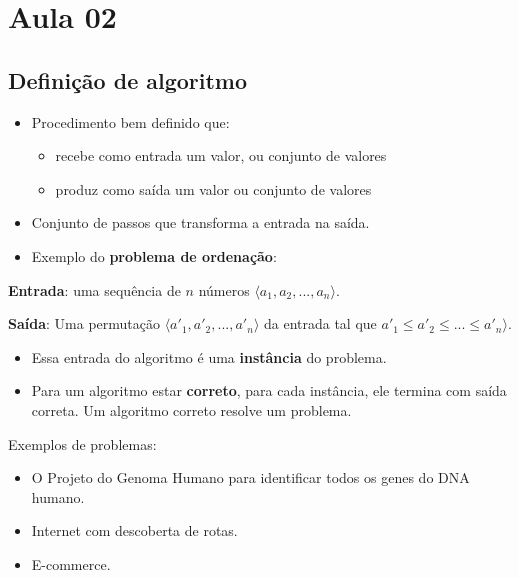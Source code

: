 \section{Aula 02}

\subsection{Definição de algoritmo}

\begin{itemize}
\item Procedimento bem definido que:
	\begin{itemize}
	\item recebe como entrada um valor, ou conjunto de valores
	\item produz como saída um valor ou conjunto de valores
	\end{itemize}
\item Conjunto de passos que transforma a entrada na saída.
\item Exemplo do {\bf problema de ordenação}:
\end{itemize}

{\bf Entrada}: uma sequência de $n$ números $\langle a_1, a_2, ..., a_n \rangle$.

{\bf Saída}:  Uma permutação $\langle {a'}_1, {a'}_2, ..., {a'}_n \rangle$ da
entrada tal que ${a'}_1 \leq {a'}_2 \leq ... \leq {a'}_n \rangle$.

\begin{itemize}
\item Essa entrada do algoritmo é uma {\bf instância} do problema.
\item Para um algoritmo estar {\bf correto}, para cada instância, ele termina com saída 
correta. Um algoritmo correto \textsf{resolve} um problema. 
\end{itemize}

Exemplos de problemas:
\begin{itemize}
\item O Projeto do Genoma Humano para identificar todos os genes do DNA humano.
\item Internet com descoberta de rotas.
\item E-commerce.
\end{itemize}

